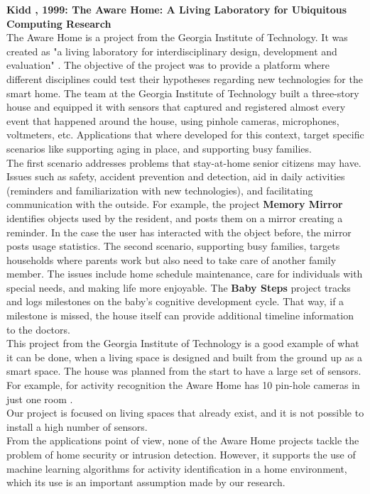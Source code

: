 \textbf{Kidd \etAl, 1999: The Aware Home: A Living Laboratory for Ubiquitous Computing Research \cite{raey}} \\
The Aware Home is a project from the Georgia Institute of Technology. It was created as "a living laboratory for interdisciplinary design, development and evaluation" \cite{Kientz:2008:GTA:1358628.1358911}. The objective of the project was to provide a platform where different disciplines could test their hypotheses regarding new technologies for the smart home. The team at the Georgia Institute of Technology built a three-story house and equipped it with sensors that captured and registered almost every event that happened around the house, using pinhole cameras, microphones, voltmeters, etc. Applications that where developed for this context, target specific scenarios like supporting aging in place, and supporting busy families. \\
The first scenario addresses problems that stay-at-home senior citizens may have. Issues such as safety, accident prevention and detection, aid in daily activities (reminders and familiarization with new technologies), and facilitating communication with the outside. For example, the project \textbf{Memory Mirror} \cite{Kientz:2008:GTA:1358628.1358911} identifies objects used by the resident, and posts them on a mirror creating a reminder. In the case the user has interacted with the object before, the mirror posts usage statistics.
The second scenario, supporting busy families, targets households where parents work but also need to take care of another family member. The issues include home schedule maintenance, care for individuals with special needs, and making life more enjoyable. The \textbf{Baby Steps} \cite{Kientz:2007:GKU:1240624.1240830} project tracks and logs milestones on the baby's cognitive development cycle. That way, if a milestone is missed, the house itself can provide additional timeline information to the doctors.\\
This project from the Georgia Institute of Technology is a good example of what it can be done, when a living space is designed and built from the ground up as a smart space. The house was planned from the start to have a large set of sensors. For example, for activity recognition the Aware Home has 10 pin-hole cameras in just one room \cite{Kientz:2008:GTA:1358628.1358911}. \\
Our project is focused on living spaces that already exist, and it is not possible to install a high number of sensors.\\
From the applications point of view, none of the Aware Home projects tackle the problem of home security or intrusion detection. However, it supports the use of machine learning algorithms for activity identification in a home environment, which its use is an important assumption made by our research. \\

